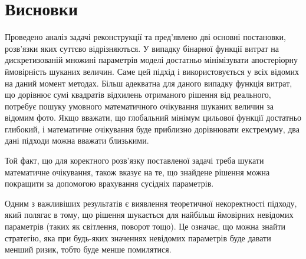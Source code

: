 \section{Висновки}

Проведено аналіз задачі реконструкції та пред'явлено дві основні постановки,
розв'язки яких суттєво відрізняються.
У випадку бінарної функції витрат на дискретизованій множині параметрів моделі
достатньо мінімізувати апостеріорну ймовірність шуканих величин.
Саме цей підхід і використовується у всіх відомих на даний момент методах.
Більш адекватна для даного випадку функція витрат,
що дорівнює сумі квадратів відхилень отриманого рішення від реального,
потребує пошуку умовного математичного очікування
шуканих величин за відомим фото.
Якщо вважати, що глобальний мінімум цильової функції достатньо глибокий,
і математичне очікування буде приблизно дорівнювати екстремуму,
два дані підходи можна вважати близькими.

Той факт,
що для коректного розв'язку поставленої задачі треба шукати
математичне очікування,
також вказує на те,
що знайдене рішення можна покращити за допомогою врахування сусідніх параметрів.

Одним з важливіших результатів є виявлення теоретичної некоректності підходу,
який полягає в тому,
що рішення шукається для найбільш ймовірних невідомих параметрів
(таких як світлення, поворот тощо).
Це означає, що можна знайти стратегію,
яка при будь-яких значеннях невідомих параметрів буде давати менший ризик,
тобто буде менше помилятися.
